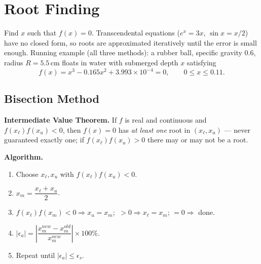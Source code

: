 \section{Root Finding}

\begin{defbox}
Find $x$ such that $f(x)=0$. Transcendental equations ($e^x=3x$, $\sin x = x/2$) have no closed form, so roots are approximated iteratively until the error is small enough. Running example (all three methods): a rubber ball, specific gravity $0.6$, radius $R=5.5\,$cm floats in water with submerged depth $x$ satisfying
\[
f(x) = x^3 - 0.165x^2 + 3.993\times10^{-4} = 0, \qquad 0\le x\le 0.11.
\]
\end{defbox}

\subsection{Bisection Method}

\textbf{Intermediate Value Theorem.} If $f$ is real and continuous and $f(x_\ell)f(x_u)<0$, then $f(x)=0$ has \emph{at least one} root in $(x_\ell,x_u)$ — never guaranteed exactly one; if $f(x_\ell)f(x_u)>0$ there may or may not be a root.

\textbf{Algorithm.}
\begin{enumerate}
\item Choose $x_\ell,x_u$ with $f(x_\ell)f(x_u)<0$.
\item $x_m = \dfrac{x_\ell+x_u}{2}$.
\item $f(x_\ell)f(x_m)<0\Rightarrow x_u=x_m$; $\ >0\Rightarrow x_\ell=x_m$; $=0\Rightarrow$ done.
\item $|\epsilon_a|=\left|\dfrac{x_m^{new}-x_m^{old}}{x_m^{new}}\right|\times100\%$.
\item Repeat until $|\epsilon_a|\le\epsilon_s$.
\end{enumerate}

